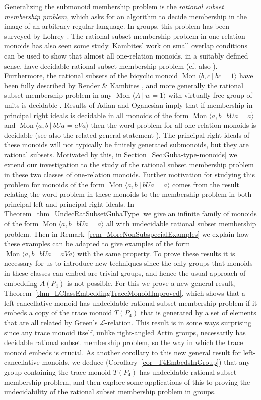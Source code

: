 \documentclass{amsart}
\newcommand{\Mpres}[2]{\operatorname{Mon}\bigl\langle #1\:|\:#2 \bigr\rangle}
\theoremstyle{plain}
\theoremstyle{definition}
\begin{document}
Generalizing the submonoid membership problem is the \textit{rational subset membership problem}, which asks for an algorithm to decide membership in the image of an arbitrary regular language. In groups, this problem has been surveyed by Lohrey \cite{Lohrey2015}. The rational subset membership problem in one-relation monoids has also seen some study. Kambites' work \cite{Kambites2009} on small overlap conditions can be used to show that almost all one-relation monoids, in a  suitably defined sense, have decidable rational subset membership problem (cf. also \cite[p. 338]{NybergBrodda2021a}). Furthermore, the rational subsets of the bicyclic monoid $\Mpres{b,c}{bc=1}$ have been fully described by Render \& Kambites \cite{Render2009}, and more generally the rational subset membership problem in any $\Mpres{A}{w=1}$ with virtually free group of units is decidable \cite{NybergBrodda2022a}.  
Results of Adian and Oganesian \cite{Adian1966, Adian1976, Adian1987} imply that if membership in principal right ideals is decidable in all monoids of the form $\Mpres{a,b}{bUa=a}$ and $\Mpres{a,b}{bUa=aVa}$ then the word problem for all one-relation monoids is decidable (see also the related general statement \cite[Lemma~3.1]{Guba1997}). The principal right ideals of these monoids will not typically be finitely generated submonoids, but they are rational subsets. Motivated by this, in Section~\ref{Sec:Guba-type-monoids} we extend our investigation to the study of the rational subset membership problem in these two classes of one-relation monoids. Further motivation for studying this problem for monoids of the form $\Mpres{a,b}{bUa=a}$ comes from the result \cite[Theorem~4.1]{Guba1997} relating the word problem in these monoids to the membership problem in both principal left and principal right ideals. 
In Theorem~\ref{thm_UndecRatSubsetGubaType} we give an infinite family of monoids of the form $\Mpres{a,b}{bUa=a}$ all with undecidable rational subset membership problem. Then in Remark~\ref{rem_MoreNonSubspecialExamples} we explain how these examples can be adapted to give examples of the form $\Mpres{a,b}{bUa=aVa}$ with the same property.  To prove these results it is necessary for us to introduce new techniques since the only groups that monoids in these classes can embed are trivial groups, and hence the usual approach of embedding $A(P_4)$ is not possible.  For this we prove a new general result, Theorem~\ref{thm_LClassEmbeddingTraceMonoidImproved}, which shows that a left-cancellative monoid has undecidable rational subset membership problem if it embeds a copy of the trace monoid $T(P_4)$ that is generated by a set of elements that are all related by Green's $\mathcal{L}$-relation. 
This result is in some ways surprising since any trace monoid itself, unlike right-angled Artin groups, necessarily has decidable rational subset membership problem, so the way in which the trace monoid embeds is crucial. As another corollary to this new general result for left-cancellative monoids, we deduce (Corollary~\ref{cor_T4EmbedsInGroup}) that any group containing the trace monoid $T(P_4)$ has undecidable rational subset membership problem, and then explore some applications of this to proving the undecidability of the rational subset membership problem in groups.  
\end{document}

